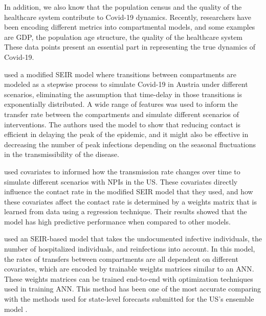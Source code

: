 In addition, we also know that the population census and the quality of the healthcare system contribute to Covid-19 dynamics.
Recently, researchers have been encoding different metrics into compartmental models, and some examples are \gls{GDP}, the population age structure, the quality of the healthcare system
These data points present an essential part in representing the true dynamics of Covid-19.

\citeauthor{schneiderCOVID19PandemicPreparedness2020} \cite{schneiderCOVID19PandemicPreparedness2020} used a modified \gls{SEIR} model where transitions between compartments are modeled as a stepwise process to simulate Covid-19 in Austria under different scenarios, eliminating the assumption that time-delay in those transitions is exponentially distributed.
A wide range of features was used to inform the transfer rate between the compartments and simulate different scenarios of interventions.
The authors used the model to show that reducing contact is efficient in delaying the peak of the epidemic, and it might also be effective in decreasing the number of peak infections depending on the seasonal fluctuations in the transmissibility of the disease.

\citeauthor{ihmecovid-19forecastingteamModelingCOVID19Scenarios2021} \cite{ihmecovid-19forecastingteamModelingCOVID19Scenarios2021} used covariates to informed how the transmission rate changes over time to simulate different scenarios with \glspl{NPI} in the \gls{US}.
These covariates directly influence the contact rate in the modified \gls{SEIR} model that they used, and how these covariates affect the contact rate is determined by a weights matrix that is learned from data using a regression technique.
Their results showed that the model has high predictive performance when compared to other models.

\citeauthor{arikInterpretableSequenceLearning} \cite{arikInterpretableSequenceLearning} used an \gls{SEIR}-based model that takes the undocumented infective individuals, the number of hospitalized individuals, and reinfections into account.
In this model, the rates of transfers between compartments are all dependent on different covariates, which are encoded by trainable weights matrices similar to an \gls{ANN}.
These weights matrices can be trained end-to-end with optimization techniques used in training \gls{ANN}.
This method has been one of the most accurate comparing with the methods used for state-level forecasts submitted for the US’s ensemble model \cite{rayEnsembleForecastsCoronavirus2020}.

